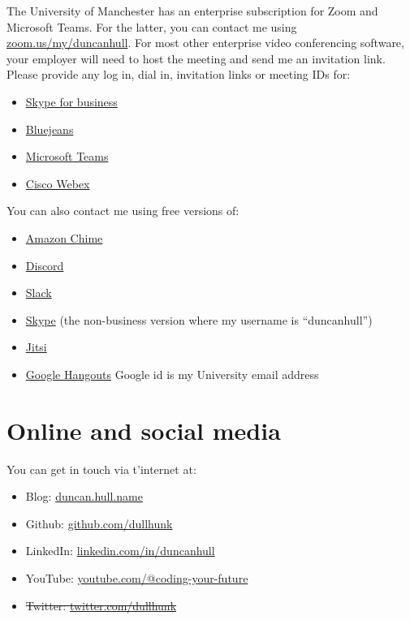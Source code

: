 \documentclass[
  12pt,
]{book}
\providecommand{\tightlist}{%
  \setlength{\itemsep}{0pt}\setlength{\parskip}{0pt}}
\begin{document}
The University of Manchester has an enterprise subscription for Zoom and Microsoft Teams. For the latter, you can contact me using \href{https://zoom.us/my/duncanhull}{zoom.us/my/duncanhull}. For most other enterprise video conferencing software, your employer will need to host the meeting and send me an invitation link. Please provide any log in, dial in, invitation links or meeting IDs for:

\begin{itemize}
\tightlist
\item
  \href{https://en.wikipedia.org/wiki/Skype_for_Business}{Skype for business}
\item
  \href{https://en.wikipedia.org/wiki/BlueJeans}{Bluejeans}
\item
  \href{https://en.wikipedia.org/wiki/Microsoft_Teams}{Microsoft Teams}
\item
  \href{https://en.wikipedia.org/wiki/Cisco_Webex}{Cisco Webex}
\end{itemize}

You can also contact me using free versions of:

\begin{itemize}
\tightlist
\item
  \href{https://aws.amazon.com/chime/}{Amazon Chime}
\item
  \href{https://en.wikipedia.org/wiki/Discord_(software)}{Discord}
\item
  \href{https://en.wikipedia.org/wiki/Slack_(software)}{Slack}
\item
  \href{https://en.wikipedia.org/wiki/Skype}{Skype} (the non-business version where my username is ``duncanhull'')
\item
  \href{https://en.wikipedia.org/wiki/Jitsi}{Jitsi}
\item
  \href{https://en.wikipedia.org/wiki/Google_Hangouts}{Google Hangouts} Google id is my University email address
\end{itemize}

\hypertarget{tinternet}{%
\section{Online and social media}\label{tinternet}}

You can get in touch via t'internet at:

\begin{itemize}
\tightlist
\item
  Blog: \href{https://duncan.hull.name}{duncan.hull.name}
\item
  Github: \href{https://github.com/dullhunk}{github.com/dullhunk}
\item
  LinkedIn: \href{https://uk.linkedin.com/in/duncanhull}{linkedin.com/in/duncanhull}
\item
  YouTube: \href{https://www.youtube.com/@coding-your-future}{youtube.com/@coding-your-future}
\item
  \st{Twitter: \href{https://twitter.com/dullhunk}{twitter.com/dullhunk}}
\end{itemize}
\end{document}
